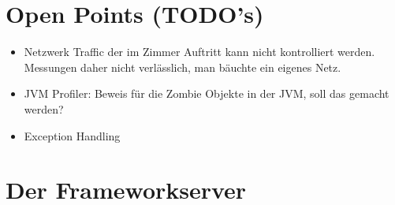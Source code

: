 \section{Open Points (TODO's)}
\begin{itemize}	
\item Netzwerk Traffic der im Zimmer Auftritt kann nicht kontrolliert werden. Messungen daher nicht verlässlich, man bäuchte ein eigenes Netz.
\item JVM Profiler: Beweis für die Zombie Objekte in der JVM, soll das gemacht werden?
\item Exception Handling
\end{itemize}


\section{Der Frameworkserver}
\label{sec:test-FW Server}
